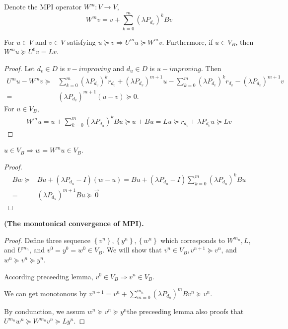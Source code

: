 Denote the MPI operator $ W^m: V \rightarrow V $,
\[
    W^m v = v + \sum^{m}_{k=0} {(\lambda P_{d_{v}})}^k Bv
\]

\begin{lemma}
    For $ u \in V $ and $ v \in V $ satisfying $ u \succeq v \Rightarrow U^m u \succeq W^m v $. Furthermore, if $ u \in V_B $, then $ W^m u \succeq U^0 v = Lv $.
    \begin{proof}
        Let $ d_v \in D $ is $ v-improving $ and $ d_u \in D $ is $ u-improving $. Then
        \begin{align*}
            U^m u - W^m v \succeq& \sum^{m}_{k=0} {(\lambda P_{d_{v}})}^k r_{d_v} + {(\lambda P_{d_v})}^{m+1} u - \sum^{m}_{k=0} {(\lambda P_{d_{v}})}^k r_{d_v} - {(\lambda P_{d_v})}^{m+1} v\\
            =& {(\lambda P_{d_v})}^{m+1} (u - v) \succeq 0.
        \end{align*}
        For $ u \in V_B $,
        \begin{align*}
            W^m u = u + \sum^{m}_{k=0} {(\lambda P_{d_u})}^k Bu \succeq u + Bu = Lu \succeq r_{d_v} + \lambda P_{d_v}u \succeq Lv
        \end{align*}
    \end{proof}
\end{lemma}

\begin{lemma}
    $ u \in V_B \Rightarrow w = W^m u \in V_B $.
    \begin{proof}
        \begin{align*}
            Bw \succeq& Bu + (\lambda P_{d_u} - I)(w - u) = Bu + (\lambda P_{d_u} - I) \sum^{m}_{k=0} {(\lambda P_{d_u})}^k Bu\\
            =& {(\lambda P_{d_u})}^{m+1} Bu \succeq \vec{0}
        \end{align*}
    \end{proof}
\end{lemma}

\begin{theorem}
    \textbf{(The monotonical convergence of MPI).}
    \begin{proof}
        Define three sequence $ \left\{ v^n \right\}, \left\{ y^n \right\}, \left\{ w^n \right\} $ which corresponds to $ W^{m_n}, L $, and $ U^{m_n} $, and $ v^0 = y^0 = w^0 \in V_B $. We will show that $ v^n \in V_B, v^{n+1} \succeq v^n $, and $ w^n \succeq v^n \succeq y^n $.

        According preceeding lemma, $ v^0 \in V_B \Rightarrow v^n \in V_B $.
        
        We can get monotonous by $ v^{n+1} = v^n + \sum^{m_n}_{m=0} {(\lambda P_{d_n})}^m B v^n \succeq v^n $.

        By condunction, we assum $ w^n \succeq v^n \succeq y^n $the preceeding lemma also proofs that $ U^{m_n} w^n \succeq W^{m_n} v^{n} \succeq L y^{n} $.
    \end{proof}
\end{theorem}

